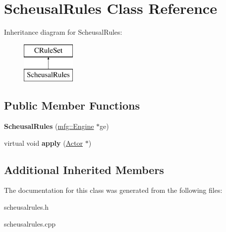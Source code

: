 \hypertarget{class_scheusal_rules}{}\section{Scheusal\+Rules Class Reference}
\label{class_scheusal_rules}
Inheritance diagram for Scheusal\+Rules\+:\begin{figure}[H]
\begin{center}
\leavevmode
\includegraphics[height=2.000000cm]{class_scheusal_rules}
\end{center}
\end{figure}
\subsection*{Public Member Functions}
\begin{DoxyCompactItemize}
\item 
\mbox{\label{class_scheusal_rules_a69f27ad6633b1e52496b9a6ffffad48d}} 
{\bfseries Scheusal\+Rules} (\hyperlink{classmfg_1_1_engine}{mfg\+::\+Engine} $\ast$ge)
\item 
\mbox{\label{class_scheusal_rules_a1d73e8287bb6c822cd6e6285522dd1bf}} 
virtual void {\bfseries apply} (\hyperlink{class_actor}{Actor} $\ast$)
\end{DoxyCompactItemize}
\subsection*{Additional Inherited Members}


The documentation for this class was generated from the following files\+:\begin{DoxyCompactItemize}
\item 
scheusalrules.\+h\item 
scheusalrules.\+cpp\end{DoxyCompactItemize}
